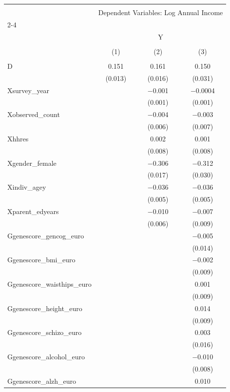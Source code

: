
\begin{tabular}{@{\extracolsep{5pt}}lccc} 
\\[-1.8ex]\hline 
\hline \\[-1.8ex] 
 & \multicolumn{3}{c}{Dependent Variables: Log Annual Income} \\ 
\cline{2-4} 
\\[-1.8ex] & \multicolumn{3}{c}{Y} \\ 
\\[-1.8ex] & (1) & (2) & (3)\\ 
\hline \\[-1.8ex] 
 D & 0.151 & 0.161 & 0.150 \\ 
  & (0.013) & (0.016) & (0.031) \\ 
  Xsurvey\_year &  & $-$0.001 & $-$0.0004 \\ 
  &  & (0.001) & (0.001) \\ 
  Xobserved\_count &  & $-$0.004 & $-$0.003 \\ 
  &  & (0.006) & (0.007) \\ 
  Xhhres &  & 0.002 & 0.001 \\ 
  &  & (0.008) & (0.008) \\ 
  Xgender\_female &  & $-$0.306 & $-$0.312 \\ 
  &  & (0.017) & (0.030) \\ 
  Xindiv\_agey &  & $-$0.036 & $-$0.036 \\ 
  &  & (0.005) & (0.005) \\ 
  Xparent\_edyears &  & $-$0.010 & $-$0.007 \\ 
  &  & (0.006) & (0.009) \\ 
  Ggenescore\_gencog\_euro &  &  & $-$0.005 \\ 
  &  &  & (0.014) \\ 
  Ggenescore\_bmi\_euro &  &  & $-$0.002 \\ 
  &  &  & (0.009) \\ 
  Ggenescore\_waisthips\_euro &  &  & 0.001 \\ 
  &  &  & (0.009) \\ 
  Ggenescore\_height\_euro &  &  & 0.014 \\ 
  &  &  & (0.009) \\ 
  Ggenescore\_schizo\_euro &  &  & 0.003 \\ 
  &  &  & (0.016) \\ 
  Ggenescore\_alcohol\_euro &  &  & $-$0.010 \\ 
  &  &  & (0.008) \\ 
  Ggenescore\_alzh\_euro &  &  & 0.010 \\ 

\end{tabular}
